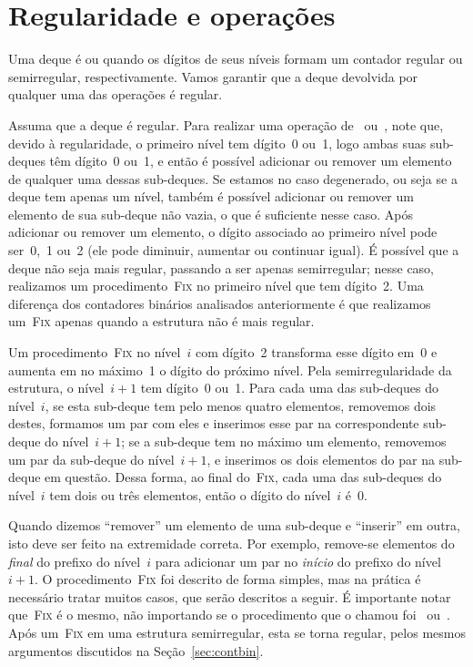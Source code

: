 \documentclass[../../main.tex]{subfiles}
\begin{document}
\section{Regularidade e operações} \label{sec:reg_op}

Uma deque é  ou  quando os dígitos de seus níveis formam um contador regular ou semirregular, respectivamente. Vamos garantir que a deque devolvida por qualquer uma das operações é regular.

Assuma que a deque é regular. Para realizar uma operação de~ ou~, note que, devido à regularidade, o primeiro nível tem dígito~0 ou~1, logo ambas suas sub-deques têm dígito~0 ou~1, e então é possível adicionar ou remover um elemento de qualquer uma dessas sub-deques. Se estamos no caso degenerado, ou seja se a deque tem apenas um nível, também é possível adicionar ou remover um elemento de sua sub-deque não vazia, o que é suficiente nesse caso.
Após adicionar ou remover um elemento, o dígito associado ao primeiro nível pode ser~0,~1 ou~2 (ele pode diminuir, aumentar ou continuar igual). É possível que a deque não seja mais regular, passando a ser apenas semirregular; nesse caso, realizamos um procedimento~\textsc{Fix} no primeiro nível que tem dígito~2. Uma diferença dos contadores binários analisados anteriormente é que realizamos um~\textsc{Fix} apenas quando a estrutura não é mais regular.

Um procedimento~\textsc{Fix} no nível~$i$ com dígito~2 transforma esse dígito em~0 e aumenta em no máximo~1 o dígito do próximo nível. Pela semirregularidade da estrutura, o nível~$i+1$ tem dígito~0 ou~1. Para cada uma das sub-deques do nível~$i$, se esta sub-deque tem pelo menos quatro elementos, removemos dois destes, formamos um par com eles e inserimos esse par na correspondente sub-deque do nível~$i+1$; se a sub-deque tem no máximo um elemento, removemos um par da sub-deque do nível~$i+1$, e inserimos os dois elementos do par na sub-deque em questão. Dessa forma, ao final do~\textsc{Fix}, cada uma das sub-deques do nível~$i$ tem dois ou três elementos, então o dígito do nível~$i$ é~0.

Quando dizemos ``remover'' um elemento de uma sub-deque e ``inserir'' em outra, isto deve ser feito na extremidade correta. Por exemplo, remove-se elementos do \emph{final} do prefixo do nível~$i$ para adicionar um par no \emph{início} do prefixo do nível~$i+1$. O procedimento~\textsc{Fix} foi descrito de forma simples, mas na prática é necessário tratar muitos casos, que serão descritos a seguir. É importante notar que~\textsc{Fix} é o mesmo, não importando se o procedimento que o chamou foi~ ou~. Após um~\textsc{Fix} em uma estrutura semirregular, esta se torna regular, pelos mesmos argumentos discutidos na Seção~\ref{sec:contbin}.
\end{document}
